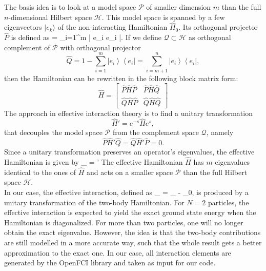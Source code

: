 The basis idea is to  look at a model space $\mathcal{P}$ of smaller dimension $m$ than the full $n$-dimensional Hilbert space $\mathcal{H}$. This model space is spanned by a few eigenvectors $|e_k\rangle$ of the non-interacting Hamiltonian $\hat{H}_0$. Its orthogonal projector $\hat{P}$ is  defined as
\be
{} = \sum_{i=1}^m \left| e_i \right\rangle \left\langle e_i \right|.
\ee
If we define $\mathcal{Q}\subset\mathcal{H}$ as orthogonal complement of $\mathcal{P}$ with orthogonal projector 
\[
\hat{Q} = 1 - \sum\limits_{i=1}^m\left| e_i \right\rangle \left\langle e_i \right| = \sum\limits_{i=m+1}^n \left| e_i \right\rangle \left\langle e_i \right|,
\]
then the Hamiltonian can be rewritten in the following block matrix form:
\[
\hat{H} = \left[\begin{array}{cc}
\hat{P}\hat{H}\hat{P} & \hat{P}\hat{H}\hat{Q}\\
\hat{Q}\hat{H}\hat{P} & \hat{Q}\hat{H}\hat{Q}
\end{array}\right]
\]
The approach in effective interaction theory is to find a unitary transformation
\[
\hat{H}' = e^{-s} \hat{H} e^s,
\]
that decouples the model space $\mathcal{P}$ from the complement space $\mathcal{Q}$, namely
\[
\hat{P}\hat{H}'\hat{Q} = \hat{Q}\hat{H}'\hat{P} = 0.
\]
Since a unitary transformation preserves an operator's eigenvalues, the effective Hamiltonian is given by
\be
{}_{} = '
\ee
The effective Hamiltonian $\hat{H}$ has $m$ eigenvalues identical to the ones of $\hat{H}$ and acts on a smaller space $\mathcal{P}$ than the full Hilbert space $\mathcal{H}$.\\
In our case, the effective interaction, defined as
\be
{}_{} = _{} - _0,
\ee
is produced by a unitary transformation of the two-body Hamiltonian.  For $N=2$ particles, the effective interaction is expected to yield the exact ground state energy when the Hamiltonian is diagonalized. For more than two particles, one will no longer obtain the  exact eigenvalue. However, the idea is that the two-body contributions are still modelled in a more accurate way, such that the whole result gets a better approximation to the exact one.  In our case, all interaction elements are generated by the OpenFCI library \cite{Kvaalcode} and taken as input for our code.


